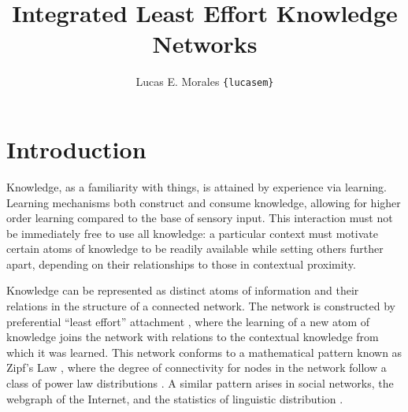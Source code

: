 \documentclass[11pt,letterpaper]{article}
\title{{\Large Integrated Least Effort Knowledge Networks}}
\author{Lucas E. Morales \texttt{\{lucasem\}}}
\date{}
\begin{document}
\maketitle

\section{Introduction}

Knowledge, as a familiarity with things, is attained by experience via
learning. Learning mechanisms both construct and consume knowledge, allowing
for higher order learning compared to the base of sensory input. This
interaction must not be immediately free to use all knowledge: a particular
context must motivate certain atoms of knowledge to be readily available
while setting others further apart, depending on their relationships to
those in contextual proximity.

Knowledge can be represented as distinct atoms of information and their
relations in the structure of a connected network. The network is
constructed by preferential ``least effort'' attachment \cite{cancho03},
where the learning of a new atom of knowledge joins the network with
relations to the contextual knowledge from which it was learned. This
network conforms to a mathematical pattern known as Zipf's Law
\cite{zipf49}, where the degree of connectivity for nodes in the network
follow a class of power law distributions \cite{barabasi99}. A similar
pattern arises in social networks, the webgraph of the Internet, and the
statistics of linguistic distribution \cite{clauset09}.

% 
\end{document}
